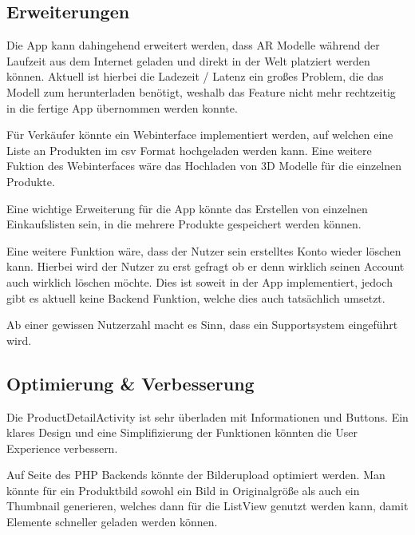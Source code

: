 \documentclass{scrartcl}
\begin{document}
\subsection{Erweiterungen}

\noindent Die App kann dahingehend erweitert werden, dass AR Modelle während der Laufzeit aus dem Internet geladen und direkt in der Welt platziert werden können. Aktuell ist hierbei die Ladezeit / Latenz ein großes Problem, die das Modell zum herunterladen benötigt, weshalb das Feature nicht mehr rechtzeitig in die fertige App übernommen werden konnte. \newline 

\noindent Für Verkäufer könnte ein Webinterface implementiert werden, auf welchen eine Liste an Produkten im csv Format hochgeladen werden kann. Eine weitere Fuktion des Webinterfaces wäre das Hochladen von 3D Modelle für die einzelnen Produkte. \newline

\noindent Eine wichtige Erweiterung für die App könnte das Erstellen von einzelnen Einkaufslisten sein, in die mehrere Produkte gespeichert werden können. \newline 

\noindent Eine weitere Funktion wäre, dass der Nutzer sein erstelltes Konto wieder löschen kann. Hierbei wird der Nutzer zu erst gefragt ob er denn wirklich seinen Account auch wirklich löschen möchte. Dies ist soweit in der App implementiert, jedoch gibt es aktuell keine Backend Funktion, welche dies auch tatsächlich umsetzt. \newline 

\noindent Ab einer gewissen Nutzerzahl macht es Sinn, dass ein Supportsystem eingeführt wird. \newline 

\subsection{Optimierung \& Verbesserung}

\noindent Die ProductDetailActivity ist sehr überladen mit Informationen und Buttons. Ein klares Design und eine Simplifizierung der Funktionen könnten die User Experience verbessern. \newline

\noindent Auf Seite des PHP Backends könnte der Bilderupload optimiert werden. Man könnte für ein Produktbild sowohl ein Bild in Originalgröße als auch ein Thumbnail generieren, welches dann für die ListView genutzt werden kann, damit Elemente schneller geladen werden können. \newline 
\end{document}
